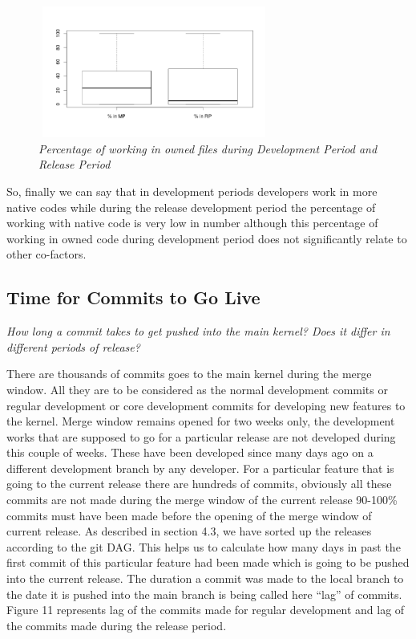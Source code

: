 \documentclass{acm_proc_article-sp}
\begin{document}
\begin{figure}
\begin{center}
\includegraphics[height=1.7in,width=3in]{ownpMPRPbox.png}
\caption{\small \sl Percentage of working in owned files during Development Period and Release Period}
\end{center}
\end{figure}

So, finally we can say that in development periods developers work in more native codes while during the release development period the percentage of working with native code is very low in number although this percentage of working in owned code during development period does not significantly relate to other co-factors.

\subsection{Time for Commits to Go Live}
\textit{How long a commit takes to get pushed into the main kernel? Does it differ in different periods of release?}

There are thousands of commits goes to the main kernel during the merge window. All they are to be considered as the normal development commits or regular development or core development commits for developing new features to the kernel. Merge window remains opened for two weeks only, the development works that are supposed to go for a particular release are not developed during this couple of weeks. These have been developed since many days ago on a different development branch by any developer. For a particular feature that is going to the current release there are hundreds of commits, obviously all these commits are not made during the merge window of the current release 90-100\% commits must have been made before the opening of the merge window of current release. As described in section 4.3, we have sorted up the releases according to the git DAG. This helps us to calculate how many days in past the first commit of this particular feature had been made which is going to be pushed into the current release. The duration a commit was made to the local branch to the date it is pushed into the main branch is being called here ``lag'' of commits. Figure 11 represents lag of the commits made for regular development and lag of the commits made during the release period.
\end{document}
